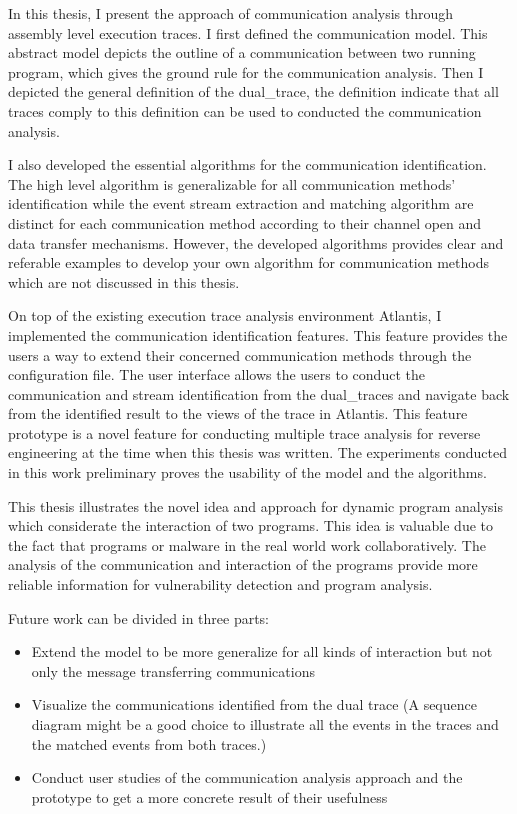 \label{concl}
In this thesis, I present the approach of communication analysis through assembly level execution traces. I first defined the communication model. This abstract model depicts the outline of a communication between two running program, which gives the ground rule for the communication analysis. Then I depicted the general definition of the dual\_trace, the definition indicate that all traces comply to this definition can be used to conducted the communication analysis.

I also developed the essential algorithms for the communication identification. The high level algorithm is generalizable for all communication methods' identification while  the event stream extraction and matching algorithm are distinct for each communication method according to their channel open and data transfer mechanisms. However, the developed algorithms provides clear and referable examples to develop your own algorithm for communication methods which are not discussed in this thesis.

On top of the existing execution trace analysis environment Atlantis, I implemented the communication identification features. This feature provides the users a way to extend their concerned communication methods through the configuration file. The user interface allows the users to conduct the communication and stream identification from the dual\_traces and navigate back from the identified result to the views of the trace in Atlantis. This feature prototype is a novel feature for conducting multiple trace analysis for reverse engineering at the time when this thesis was written. The experiments conducted in this work preliminary proves the usability of the model and the algorithms. 

This thesis illustrates the novel idea and approach for dynamic program analysis which considerate the interaction of two programs. This idea is valuable due to the fact that programs or malware in the real world work collaboratively. The analysis of the communication and interaction of the programs provide more reliable information for vulnerability detection and program analysis.

Future work can be divided in three parts:
\begin{itemize}
\item Extend the model to be more generalize for all kinds of interaction but not only the message transferring communications
\item Visualize the communications identified from the dual trace (A sequence diagram might be a good choice to illustrate all the events in the traces and the matched events from both traces.) 
\item Conduct user studies of the communication analysis approach and the prototype to get a more concrete result of their usefulness
\end{itemize}


